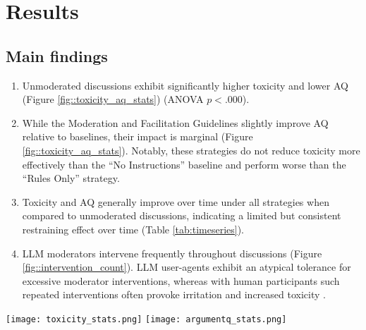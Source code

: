 %

\section{Results}
\label{sec:results}

\subsection{Main findings}

\begin{enumerate}
    \item Unmoderated discussions exhibit significantly higher toxicity and lower \ac{AQ} (Figure \ref{fig::toxicity_aq_stats}) (ANOVA $p<.000$).

    \item  While the Moderation and Facilitation Guidelines slightly improve \ac{AQ} relative to baselines, their impact is marginal (Figure \ref{fig::toxicity_aq_stats}). Notably, these strategies do not reduce toxicity more effectively than the “No Instructions” baseline and perform worse than the “Rules Only” strategy.

    \item Toxicity and \ac{AQ} generally improve over time under all strategies when compared to unmoderated discussions, indicating a limited but consistent restraining effect over time (Table \ref{tab:timeseries}).

    \item \ac{LLM} moderators intervene frequently throughout discussions (Figure \ref{fig::intervention_count}). \ac{LLM} user-agents exhibit an atypical tolerance for excessive moderator interventions, whereas with human participants such repeated interventions often provoke irritation and increased toxicity \cite{schaffner_community_guidelines, make_reddit_great, proactive_moderation, cresci_pesonalized_interventions}.
\end{enumerate}


\begin{figure*}[t]
    \texttt{[image: toxicity\_stats.png]} \hfill
    \texttt{[image: argumentq\_stats.png]}
	\centering
	\caption{Mean difference of Toxicity (left) and \ac{AQ} (right) between each moderation strategy. $A[i, j] = 0.3^{***}$ indicates that the strategy $i$ leads to overall worse discussions (more toxicity/worse arguments) compared to $j$ for an average of $0.3$ points with $p<0.001$. Each comparison is accompanied by pairwise student-t tests, in the form of significance asterisks.}
	\label{fig::toxicity_aq_stats}
\end{figure*}

